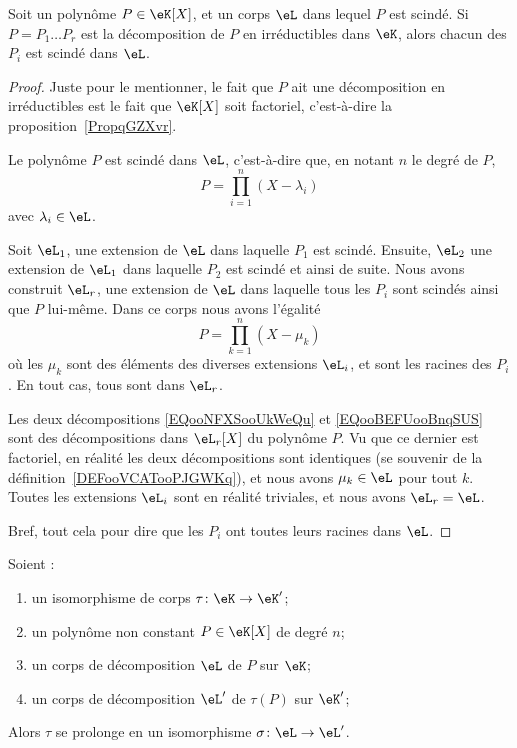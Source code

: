 \begin{lemma}        \label{LEMooJNGWooTXdGre}
	Soit un polynôme \( P\in \eK[X]\), et un corps \( \eL\) dans lequel \( P\) est scindé. Si \( P=P_1\ldots P_r\) est la décomposition de \( P\) en irréductibles dans \( \eK\), alors chacun des \( P_i\) est scindé dans \( \eL\).
\end{lemma}

\begin{proof}
	Juste pour le mentionner, le fait que \( P\) ait une décomposition en irréductibles est le fait que \( \eK[X]\) soit factoriel, c'est-à-dire la proposition~\ref{PropqGZXvr}.

	Le polynôme \( P\) est scindé dans \( \eL\), c'est-à-dire que, en notant \( n\) le degré de \( P\),
	\begin{equation}        \label{EQooNFXSooUkWeQu}
		P=\prod_{i=1}^n(X-\lambda_i)
	\end{equation}
	avec \( \lambda_i\in \eL\).

	Soit \( \eL_1\), une extension de \( \eL\) dans laquelle \( P_1\) est scindé. Ensuite, \( \eL_2\) une extension de \( \eL_1\) dans laquelle \( P_2\) est scindé et ainsi de suite. Nous avons construit \( \eL_r\), une extension de \( \eL\) dans laquelle tous les \( P_i\) sont scindés ainsi que \( P\) lui-même. Dans ce corps nous avons l'égalité
	\begin{equation}        \label{EQooBEFUooBnqSUS}
		P=\prod_{k=1}^n(X-\mu_k)
	\end{equation}
	où les \( \mu_k\) sont des éléments des diverses extensions \( \eL_i\), et sont les racines des \( P_i\). En tout cas, tous sont dans \( \eL_r\).

	Les deux décompositions \eqref{EQooNFXSooUkWeQu} et \eqref{EQooBEFUooBnqSUS} sont des décompositions dans \( \eL_r[X]\) du polynôme \( P\). Vu que ce dernier est factoriel, en réalité les deux décompositions sont identiques (se souvenir de la définition~\ref{DEFooVCATooPJGWKq}), et nous avons \( \mu_k\in \eL\) pour tout \( k\). Toutes les extensions \( \eL_i\) sont en réalité triviales, et nous avons \( \eL_r=\eL\).

	Bref, tout cela pour dire que les \( P_i\) ont toutes leurs racines dans \( \eL\).
\end{proof}

\begin{theorem}      \label{THOooQVKWooZAAYxK}
	Soient :
	\begin{enumerate}
		\item un isomorphisme de corps \( \tau\colon \eK\to \eK'\);
		\item un polynôme non constant \( P\in \eK[X]\) de degré \( n\);
		\item un corps de décomposition \( \eL\) de \( P\) sur \( \eK\);
        \item un corps de décomposition \( \eL'\) de \( \tau(P)\) sur \( \eK'\);
	\end{enumerate}
	Alors \( \tau\) se prolonge en un isomorphisme \( \sigma\colon \eL\to \eL'\).
\end{theorem}

